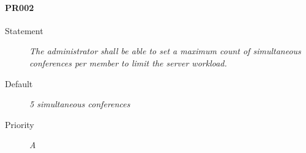\paragraph{PR002}
  \begin{description}
  \item [Statement] 
    \textit{ The administrator shall be able to set a maximum count of simultaneous conferences per member to limit the server workload.}
  \item [Default] \textit{5 simultaneous conferences}
  \item [Priority] \textit{A}
\end{description}
